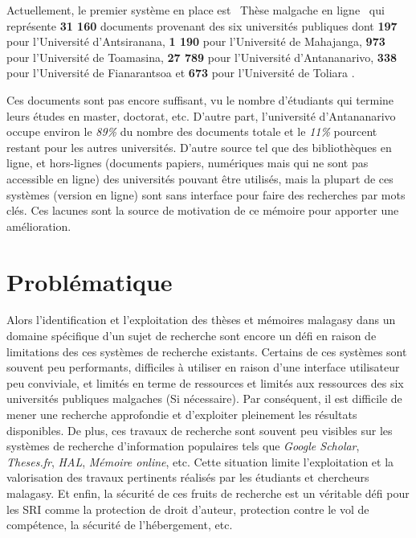 Actuellement, le premier système en place est \og~Thèse malgache en ligne~\fg{} qui représente \textbf{31 160} documents provenant des six universités publiques dont \textbf{197} pour l'Université d'Antsiranana, \textbf{1 190} pour l'Université de Mahajanga, \textbf{973} pour l'Université de Toamasina, \textbf{27 789} pour l'Université d'Antananarivo, \textbf{338} pour l'Université de Fianarantsoa et \textbf{673} pour l'Université de Toliara \citep{these-malgache-en-ligne}.

Ces documents sont pas encore suffisant, vu le nombre d’étudiants qui termine leurs études en master, doctorat, etc. D'autre part, l'université d'Antananarivo occupe environ le \emph{89\%} du nombre des documents totale et le \emph{11\%} pourcent restant pour les autres universités. D'autre source tel que des bibliothèques en ligne, et hors-lignes (documents papiers, numériques mais qui ne sont pas accessible en ligne) des universités pouvant être utilisés, mais la plupart de ces systèmes (version en ligne) sont sans interface pour faire des recherches par mots clés. Ces lacunes sont la source de motivation de ce mémoire pour apporter une amélioration.

\section*{Problématique}
Alors l'identification et l'exploitation des thèses et mémoires malagasy dans un domaine spécifique d'un sujet de recherche sont encore un défi en raison de limitations des ces systèmes de recherche existants. Certains de ces systèmes sont souvent peu performants, difficiles à utiliser en raison d'une interface utilisateur peu conviviale, et limités en terme de ressources et limités aux ressources des six universités publiques malgaches (Si nécessaire). Par conséquent, il est difficile de mener une recherche approfondie et d'exploiter pleinement les résultats disponibles. De plus, ces travaux de recherche sont souvent peu visibles sur les systèmes de recherche d'information populaires tels que \emph{Google Scholar}, \emph{Theses.fr}, \emph{HAL}, \emph{Mémoire online}, etc. Cette situation limite l'exploitation et la valorisation des travaux pertinents réalisés par les étudiants et chercheurs malagasy. Et enfin, la sécurité de ces fruits de recherche est un véritable défi pour les SRI comme la protection de droit d'auteur, protection contre le vol de compétence, la sécurité de l'hébergement, etc.

